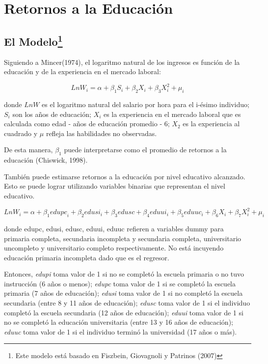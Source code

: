\documentclass[a4paper]{article}
\theoremstyle{plain}
\theoremstyle{definition}
\begin{document}
\newpage
\section{Retornos a la Educación}
\label{sec:concepts}

\subsection{El Modelo\footnote{Este modelo está basado en Fiszbein, Giovagnoli y Patrinos (2007)}}

Siguiendo a Mincer(1974), el logaritmo natural de los ingresos es función de la educación y de la experiencia en el mercado laboral: 

\begin{equation}
    LnW_i=\alpha+\beta_1S_i+\beta_2X_i+ \beta_3X^2_i+\mu_i
\end{equation}

donde $LnW$ es el logaritmo natural del salario por hora para el i-ésimo individuo; $S_i$ son los años de educación; $X_i$ es la experiencia en el mercado laboral que es calculada como edad - años de educación promedio - 6; $X_2$ es la experiencia al cuadrado y $\mu$ refleja las habilidades no observadas.

De esta manera, $\beta_1$ puede interpretarse como el promedio de retornos a la educación (Chiswick, 1998). 

También puede estimarse retornos a la educación por nivel educativo alcanzado. Esto se puede lograr utilizando variables binarias que representan el nivel educativo.  

\begin{equation}
    LnW_i=\alpha+\beta_1 {edupc}_i+ \beta_2 {edusi}_i+\beta_3 {edusc}+\beta_4 {eduui}_i+\beta_5 {eduuc}_i+ \beta_6 X_i+\beta_7 X^2_i+\mu_i
\end{equation}

donde edupc, edusi, edusc, eduui, eduuc refieren a variables dummy para primaria completa, secundaria incompleta y secundaria completa, universitario uncompleto y universitario completo respectivamente. No está incuyendo educación primaria incompleta dado que es el regresor. 

Entonces, \textit{edupi} toma valor de 1 si no se completó la escuela primaria o no tuvo instrucción (6 años o menos); \textit{edupc} toma valor de 1 si se completó la escuela primaria (7 años de educación); \textit{edusi} toma valor de 1 si no completó la escuela secundaria (entre 8 y 11 años de educación); \textit{edusc} toma valor de 1 si el individuo completó la escuela secundaria (12 años de educación); \textit{eduui} toma valor de 1 si no se completó la educación universitaria (entre 13 y 16 años de educación); \textit{eduuc} toma valor de 1 si el individuo terminó la universidad (17 años o más).
\end{document}

